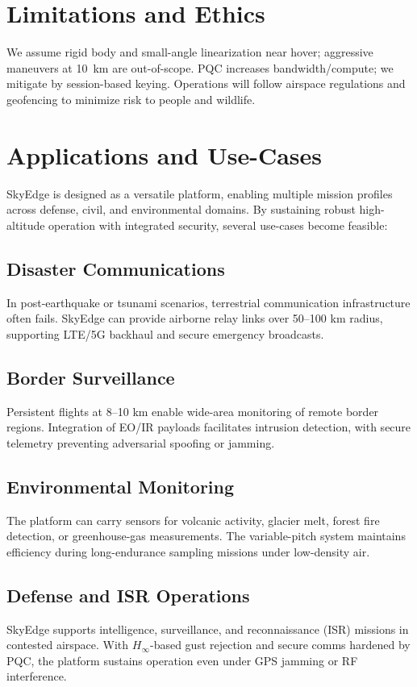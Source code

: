 \documentclass[conference]{IEEEtran}
\begin{document}
\section{Limitations and Ethics}
We assume rigid body and small-angle linearization near hover; aggressive maneuvers at 10~km are out-of-scope. PQC increases bandwidth/compute; we mitigate by session-based keying. Operations will follow airspace regulations and geofencing to minimize risk to people and wildlife.

\section{Applications and Use-Cases}
SkyEdge is designed as a versatile platform, enabling multiple mission
profiles across defense, civil, and environmental domains. By sustaining
robust high-altitude operation with integrated security, several
use-cases become feasible:  

\subsection{Disaster Communications}
In post-earthquake or tsunami scenarios, terrestrial communication
infrastructure often fails. SkyEdge can provide airborne relay links
over 50--100 km radius, supporting LTE/5G backhaul and secure emergency
broadcasts.  

\subsection{Border Surveillance}
Persistent flights at 8--10 km enable wide-area monitoring of remote
border regions. Integration of EO/IR payloads facilitates intrusion
detection, with secure telemetry preventing adversarial spoofing or
jamming.  

\subsection{Environmental Monitoring}
The platform can carry sensors for volcanic activity, glacier melt,
forest fire detection, or greenhouse-gas measurements. The variable-pitch
system maintains efficiency during long-endurance sampling missions
under low-density air.  

\subsection{Defense and ISR Operations}
SkyEdge supports intelligence, surveillance, and reconnaissance (ISR)
missions in contested airspace. With $H_\infty$-based gust rejection and
secure comms hardened by PQC, the platform sustains operation even under
GPS jamming or RF interference.  
\end{document}
